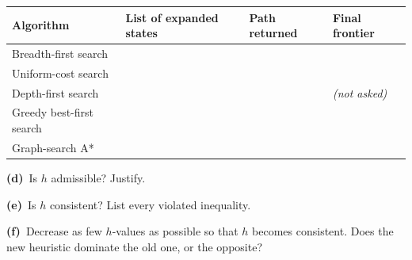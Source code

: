 \documentclass[11pt,a4paper]{article}
\newcommand{\subq}[1]{\par\smallskip\noindent\textbf{#1}\ }
\begin{document}
\begin{center}\small\begin{tabularx}{\linewidth}{|>{\raggedright}p{2.6cm}|>{\raggedright}X|>{\raggedright}p{3.6cm}|>{\raggedright\arraybackslash}p{2.6cm}|}\hline
\textbf{Algorithm} & \textbf{List of expanded states} & \textbf{Path returned} & \textbf{Final frontier}\\ \hline
Breadth-first search & & & \\[8mm] \hline
Uniform-cost search & & & \\[8mm] \hline
Depth-first search & & & \textit{(not asked)}\\[8mm] \hline
Greedy best-first search & & & \\[8mm] \hline
Graph-search A* & & & \\[8mm] \hline
\end{tabularx}\end{center}
\subq{(d)}Is $h$ admissible? Justify.
\begin{ansbox}[height=1.2cm]\end{ansbox}
\subq{(e)}Is $h$ consistent? List every violated inequality.
\begin{ansbox}[height=1.6cm]\end{ansbox}
\subq{(f)}Decrease as few $h$-values as possible so that $h$ becomes consistent. Does the new heuristic dominate the old one, or the opposite?
\begin{ansbox}[height=1.8cm]\end{ansbox}
\clearpage
\end{document}
